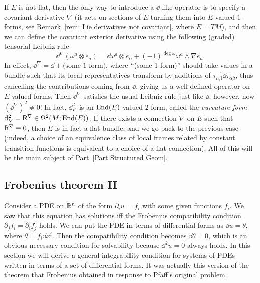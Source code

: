 \begin{rem}
    If $E$ is not flat, then the only way to introduce a $\dd$-like operator is to specify a covariant derivative $\nabla$ (it acts on sections of $E$ turning them into $E$-valued $1$-forms, see Remark~\ref{rem: Lie derivatives not covariant}, where $E=TM$), and then we can define the covariant exterior derivative using the following (graded) tensorial Leibniz rule
    \[\dd^\nabla(\omega^a\otimes e_a)=\dd\omega^a\otimes e_a+(-1)^{\deg \omega}\omega^a\wedge\nabla e_a.\]
    In effect, $\dd^\nabla=\dd +\text{(some 1-form)}$, where ``(some 1-form)'' should take values in a bundle such that its local representatives transform by additions of $\tau_{\alpha\beta}^{-1}\dd\tau_{\alpha\beta}$, thus cancelling the contributions coming from $\dd$, giving us a well-defined operator on $E$-valued forms.
    Then $\dd^\nabla$ satisfies the usual Leibniz rule just like $\dd$, however, now $(\dd^\nabla)^2\neq 0$! In fact, $\dd_\nabla^2$ is an $\operatorname{End}(E)$-valued $2$-form, called the \emph{curvature form} ${\mathrm{d}}_\nabla^2=\mathsf{R}^\nabla\in\Omega^2(M;\operatorname{End}(E))$. If there exists a connection $\nabla$ on $E$ such that $\mathsf{R}^\nabla\equiv 0$, then $E$ is in fact a flat bundle, and we go back to the previous case (indeed, a choice of an equivalence class of local frames related by constant transition functions is equivalent to a choice of a flat connection). All of this will be the main subject of Part~\ref{Part Structured Geom}.
\end{rem}

\subsection{Frobenius theorem II}\label{sec: frobenius ii}


Consider a PDE on $\mathbb{R}^n$ of the form $\partial_i u=f_i$ with some given functions $f_i$. We saw that this equation has solutions iff the Frobenius compatibility condition $\partial_jf_i=\partial_i f_j$ holds. We can put the PDE in terms of differential forms as $\dd u=\theta$, where $\theta=f_i\dd x^i$. Then the compatibility condition becomes $\dd \theta=0$, which is an obvious necessary condition for solvability because $\dd ^2 u=0$ always holds. In this section we will derive a general integrability condition for systems of PDEs written in terms of a set of differential forms. It was actually this version of the theorem that Frobenius obtained in response to Pfaff's original problem.

